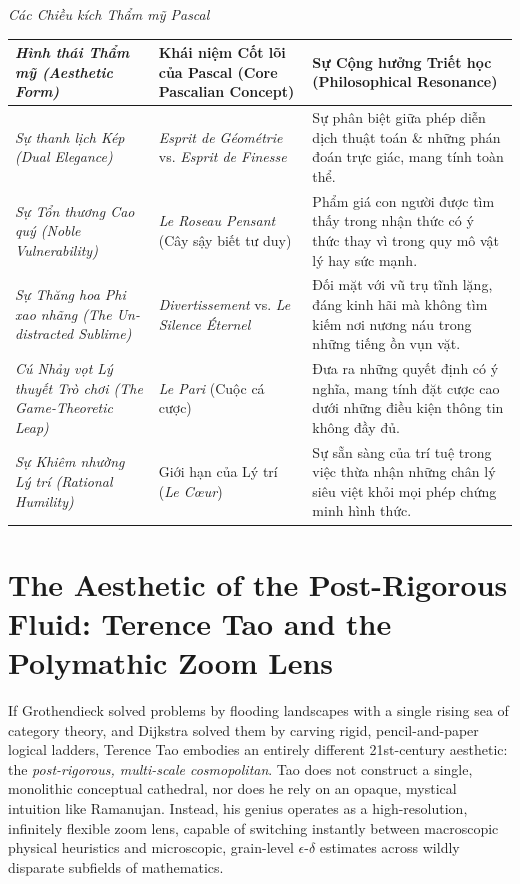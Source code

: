 \documentclass[11pt]{article}
\begin{document}
\emph{Các Chiều kích Thẩm mỹ Pascal}
\begin{table}[H]
\centering
\begin{tabular}{@{}p{3cm}p{6cm}p{6cm}@{}}
\toprule
\emph{Hình thái Thẩm mỹ (Aesthetic Form)} & \textbf{Khái niệm Cốt lõi của Pascal (Core Pascalian Concept)} & \textbf{Sự Cộng hưởng Triết học (Philosophical Resonance)} \\
\midrule
\emph{Sự thanh lịch Kép (Dual Elegance)} & \textit{Esprit de G\'eom\'etrie} vs. \textit{Esprit de Finesse} & Sự phân biệt giữa phép diễn dịch thuật toán \& những phán đoán trực giác, mang tính toàn thể. \\

\emph{Sự Tổn thương Cao quý (Noble Vulnerability)} & \textit{Le Roseau Pensant} (Cây sậy biết tư duy) & Phẩm giá con người được tìm thấy trong nhận thức có ý thức thay vì trong quy mô vật lý hay sức mạnh. \\

\emph{Sự Thăng hoa Phi xao nhãng (The Un-distracted Sublime)} & \textit{Divertissement} vs. \textit{Le Silence \'Eternel} & Đối mặt với vũ trụ tĩnh lặng, đáng kinh hãi mà không tìm kiếm nơi nương náu trong những tiếng ồn vụn vặt. \\

\emph{Cú Nhảy vọt Lý thuyết Trò chơi (The Game-Theoretic Leap)} & \textit{Le Pari} (Cuộc cá cược) & Đưa ra những quyết định có ý nghĩa, mang tính đặt cược cao dưới những điều kiện thông tin không đầy đủ. \\

\emph{Sự Khiêm nhường Lý trí (Rational Humility)} & Giới hạn của Lý trí (\textit{Le C\oe ur}) & Sự sẵn sàng của trí tuệ trong việc thừa nhận những chân lý siêu việt khỏi mọi phép chứng minh hình thức. \\
\bottomrule
\end{tabular}
\end{table}

\section{The Aesthetic of the Post-Rigorous Fluid: Terence Tao and the Polymathic Zoom Lens}
If Grothendieck solved problems by flooding landscapes with a single rising sea of category theory, and Dijkstra solved them by carving rigid, pencil-and-paper logical ladders, Terence Tao embodies an entirely different 21st-century aesthetic: the \emph{post-rigorous, multi-scale cosmopolitan}. Tao does not construct a single, monolithic conceptual cathedral, nor does he rely on an opaque, mystical intuition like Ramanujan. Instead, his genius operates as a high-resolution, infinitely flexible zoom lens, capable of switching instantly between macroscopic physical heuristics and microscopic, grain-level $\epsilon$-$\delta$ estimates across wildly disparate subfields of mathematics.
\end{document}
